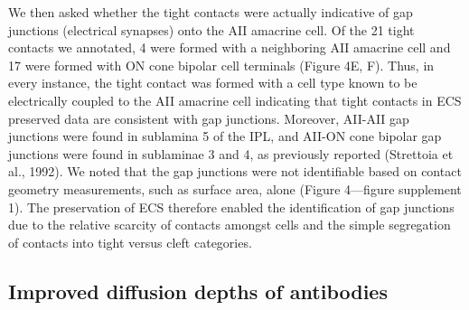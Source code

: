 \documentclass{article}
\begin{document}
\noindent We then asked whether the tight contacts were actually indicative of gap junctions (electrical synapses) onto the AII amacrine cell. Of the 21 tight contacts we annotated, 4 were formed with a neighboring AII amacrine cell and 17 were formed with ON cone bipolar cell terminals (Figure 4E, F). Thus, in every instance, the tight contact was formed with a cell type known to be electrically coupled to the AII amacrine cell indicating that tight contacts in ECS preserved data are consistent with gap junctions. Moreover, AII-AII gap junctions were found in sublamina 5 of the IPL, and AII-ON cone bipolar gap junctions were found in sublaminae 3 and 4, as previously reported (Strettoia et al., 1992). We noted that the gap junctions were not identifiable based on contact geometry measurements, such as surface area, alone (Figure 4—figure supplement 1). The preservation of ECS therefore enabled the identification of gap junctions due to the relative scarcity of contacts amongst cells and the simple segregation of contacts into tight versus cleft categories.

\subsection*{Improved diffusion depths of antibodies}
\end{document}
